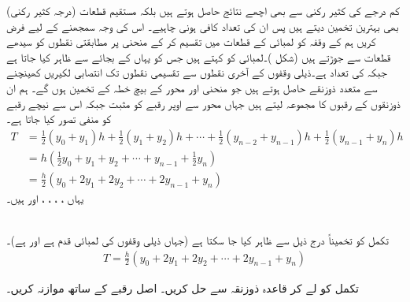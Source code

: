 کم درجے کی کثیر رکنی سے بھی اچھے نتائج حاصل ہوتے ہیں بلکہ مستقیم قطعات (درجہ  کثیر رکنی) بھی بہترین تخمین دیتے ہیں پس ان کی تعداد کافی ہونی چاہیے۔ اس کی وجہ سمجھنے کے لیے فرض کریں ہم  کے وقفہ  کو  لمبائی کے  قطعات میں تقسیم کر کے منحنی پر مطابقتی نقطوں کو سیدھے قطعات سے جوڑتے ہیں (شکل )۔لمبائی  کو  کہتے ہیں جس کو یہاں  کے بجائے  سے ظاہر کیا جاتا ہے جبکہ   کی تعداد ہے۔ذیلی وقفوں کے آخری نقطوں سے تقسیمی نقطوں تک انتصابی لکیریں کھینچنے سے متعدد  ذوزنقے حاصل ہوتے  ہیں جو منحنی اور محور   کے بیچ خطہ کے تخمین ہوں گے۔ ہم ان ذوزنقوں  کے رقبوں کا مجموعہ لیتے ہیں جہاں محور   سے اوپر رقبے کو مثبت جبکہ اس سے نیچے رقبے کو منفی تصور کیا جاتا ہے۔
\begin{align*}
T&=\frac{1}{2}(y_0+y_1)h+\frac{1}{2}(y_1+y_2)h+\cdots+\frac{1}{2}(y_{n-2}+y_{n-1})h+\frac{1}{2}(y_{n-1}+y_n)h\\
&=h(\frac{1}{2}y_0+y_1+y_2+\cdots+y_{n-1}+\frac{1}{2}y_n)\\
&=\frac{h}{2}(y_0+2y_1+2y_2+\cdots+2y_{n-1}+y_n)
\end{align*}
یہاں ، ، ، ،  اور  ہیں۔

\\
تکمل  کو تخمیناً درج ذیل سے ظاہر کیا جا سکتا ہے (جہاں  ذیلی وقفوں کی لمبائی قدم  ہے اور  ہے)۔
\begin{align}\label{مساوات_تکمل_ذوزنقہ_قاعدہ}
T=\frac{h}{2}(y_0+2y_1+2y_2+\cdots+2y_{n-1}+y_n)
\end{align}

تکمل کو   لے کر   قاعدہ  ذوزنقہ سے حل کریں۔ اصل رقبے کے ساتھ موازنہ کریں۔

